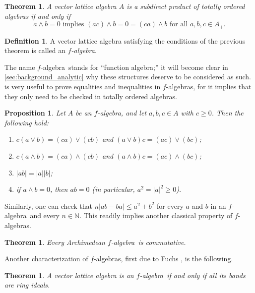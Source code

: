 \documentclass{memo-l}
\newtheorem{thm}[theorem]{Theorem}
\newtheorem{prop}[theorem]{Proposition}
\theoremstyle{definition}
\newtheorem{defn}[theorem]{Definition}
\theoremstyle{remark}
\numberwithin{section}{chapter}
\numberwithin{equation}{chapter}
\newcommand\N{\ensuremath{\mathbb{N}}}
\newcommand{\falg}{$f\!$-algebra}
\begin{document}
\begin{thm}\label{thm:subdirect_product}
    A vector lattice algebra $A$ is a subdirect product of totally ordered
    algebras if and only if
    \[
    a\wedge b=0\text{ implies }(ac)\wedge b=0=(ca)\wedge b\text{ for
    all
    }a,b,c \in A_+.
    \]
\end{thm}

\begin{defn}
    A vector lattice algebra satisfying the conditions of the previous
    theorem is called an \emph{\falg}.
\end{defn}

The name \falg\ stands for ``function algebra;'' it will become clear
in
\cref{sec:background_analytic} why these
structures deserve to be considered as such.
 is very useful to prove equalities and
inequalities in \falg s, for it implies that they only need to be
checked in totally ordered algebras.

\begin{prop}
    Let $A$ be an \falg, and let $a,b,c \in A$ with $c\ge 0$. Then the
    following hold:
    \begin{enumerate}
        \item $c(a\vee b)=(ca)\vee (cb)$ and $(a\vee b)c=(ac)\vee
            (bc)$;
        \item $c(a\wedge b)=(ca)\wedge (cb)$ and $(a\wedge b)c=(ac)\wedge
            (bc)$;
        \item $|ab|=|a| |b|$;
        \item if $a\wedge b=0$, then $ab=0$ (in particular,
            $a^2=|a|^2\ge 0$).
    \end{enumerate}
\end{prop}

Similarly, one can check that $n|ab - ba|\le a^2+b^2$ for every $a$
and $b$ in an \falg\ and every $n \in \N$. This readily implies
another classical property of \falg s.

\begin{thm}
    Every Archimedean \falg\ is commutative.
\end{thm}

Another characterization of \falg s, first due to Fuchs \cite[Section
IX.3]{fuchs1963}, is the following.

\begin{thm}\label{thm:bands_ring_ideals}
    A vector lattice algebra is an \falg\ if and only if all its bands
    are ring ideals.
\end{thm}
\end{document}
